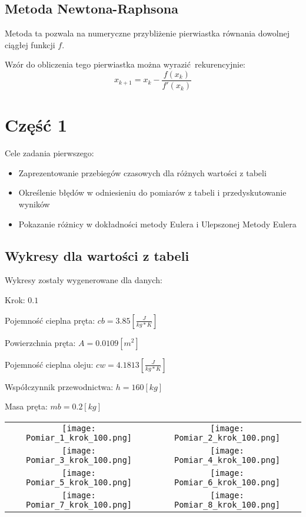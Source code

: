 \documentclass[varwidth,12pt,a4paper]{article}
\begin{document}


\subsection{Metoda Newtona-Raphsona}

Metoda ta pozwala na numeryczne przybliżenie pierwiastka równania dowolnej ciągłej funkcji $f$.

Wzór do obliczenia tego pierwiastka można wyrazić rekurencyjnie:
\begin{equation}
    x_{k+1} = x_k - \frac{f(x_k)}{f'(x_k)}
\end{equation}

\section{Część 1}

Cele zadania pierwszego:

\begin{itemize}
  \item Zaprezentowanie przebiegów czasowych dla różnych wartości z tabeli
  \item Określenie błędów w odniesieniu do pomiarów z tabeli i przedyskutowanie wyników
  \item Pokazanie różnicy w dokładności metody Eulera i Ulepszonej Metody Eulera
\end{itemize}

\subsection{Wykresy dla wartości z tabeli}

Wykresy zostały wygenerowane dla danych:

Krok: $0.1$

Pojemność cieplna pręta: $cb=3.85[\frac{J}{kg * K}]$ 

Powierzchnia pręta: $A=0.0109[m^2]$

Pojemność cieplna oleju: $cw=4.1813[\frac{J}{kg * K}]$

Współczynnik przewodnictwa: $h=160[kg]$

Masa pręta: $mb=0.2[kg]$

\begin{tabular}{cc}
    \texttt{[image: Pomiar\_1\_krok\_100.png]} &
    \texttt{[image: Pomiar\_2\_krok\_100.png]} \\
    \texttt{[image: Pomiar\_3\_krok\_100.png]} &
    \texttt{[image: Pomiar\_4\_krok\_100.png]} \\
    \texttt{[image: Pomiar\_5\_krok\_100.png]} &
    \texttt{[image: Pomiar\_6\_krok\_100.png]} \\
    \texttt{[image: Pomiar\_7\_krok\_100.png]} &
    \texttt{[image: Pomiar\_8\_krok\_100.png]} 
\end{tabular}
\end{document}
